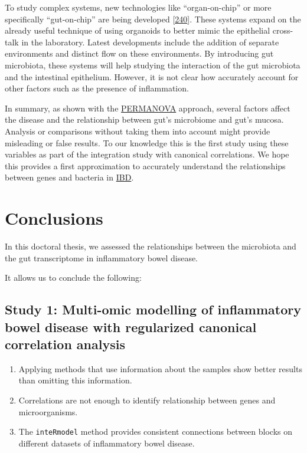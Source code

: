 \documentclass[
  12pt,
  a4paper,
  twoside,
  openright]{book}
\providecommand{\tightlist}{%
  \setlength{\itemsep}{0pt}\setlength{\parskip}{0pt}}
\begin{document}
To study complex systems, new technologies like ``organ-on-chip'' or more specifically ``gut-on-chip'' are being developed {[}\protect\hyperlink{ref-collij2021}{240}{]}.
These systems expand on the already useful technique of using organoids to better mimic the epithelial cross-talk in the laboratory.
Latest developments include the addition of separate environments and distinct flow on these environments.
By introducing gut microbiota, these systems will help studying the interaction of the gut microbiota and the intestinal epithelium.
However, it is not clear how accurately account for other factors such as the presence of inflammation.

In summary, as shown with the \protect\hyperlink{acronyms_PERMANOVA}{PERMANOVA} approach, several factors affect the disease and the relationship between gut's microbiome and gut's mucosa.
Analysis or comparisons without taking them into account might provide misleading or false results.
To our knowledge this is the first study using these variables as part of the integration study with canonical correlations.
We hope this provides a first approximation to accurately understand the relationships between genes and bacteria in \protect\hyperlink{acronyms_IBD}{IBD}.

\hypertarget{conclusions}{%
\chapter{Conclusions}\label{conclusions}}

In this doctoral thesis, we assessed the relationships between the microbiota and the gut transcriptome in inflammatory bowel disease.

It allows us to conclude the following:

\hypertarget{study-1-multi-omic-modelling-of-inflammatory-bowel-disease-with-regularized-canonical-correlation-analysis}{%
\section{Study 1: Multi-omic modelling of inflammatory bowel disease with regularized canonical correlation analysis}\label{study-1-multi-omic-modelling-of-inflammatory-bowel-disease-with-regularized-canonical-correlation-analysis}}

\begin{enumerate}
\def\labelenumi{\arabic{enumi}.}
\tightlist
\item
  Applying methods that use information about the samples show better results than omitting this information.
\item
  Correlations are not enough to identify relationship between genes and microorganisms.
\item
  The \texttt{inteRmodel} method provides consistent connections between blocks on different datasets of inflammatory bowel disease.
\end{enumerate}
\end{document}
